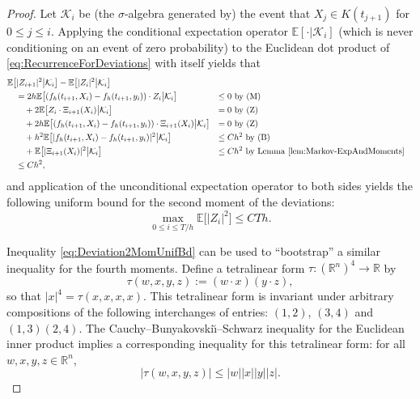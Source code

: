 \documentclass[reqno]{amsart}
\theoremstyle{definition}
\begin{document}
\begin{proof}
	Let $\mathcal{K}_{i}$ be (the $\sigma$-algebra generated by) the event that $X_{j} \in K(t_{j + 1})$ for $0 \leq j \leq i$.  Applying the conditional expectation operator ${\mathbb{E}} [ \cdot | \mathcal{K}_{i} ]$ (which is never conditioning on an event of zero probability) to the Euclidean dot product of \eqref{eq:RecurrenceForDeviations} with itself yields that
	\begin{align*}
		& {\mathbb{E}} \big[ | Z_{i + 1} |^{2} \big| \mathcal{K}_{i} \big] - {\mathbb{E}} \big[ | Z_{i} |^{2} \big| \mathcal{K}_{i} \big] \\
		& \quad = 2 h {\mathbb{E}} \big[ (f_{h} (t_{i + 1}, X_{i}) - f_{h} (t_{i + 1}, y_{i})) \cdot Z_{i} \big| \mathcal{K}_{i} \big] && \text{$\leq 0$ by (M)} \\
		& \qquad + 2 {\mathbb{E}} \big[ Z_{i} \cdot \Xi_{i + 1} (X_{i}) \big| \mathcal{K}_{i} \big] && \text{$= 0$ by (Z)} \\
		& \qquad + 2 h {\mathbb{E}} \big[ (f_{h} (t_{i + 1}, X_{i}) - f_{h} (t_{i + 1}, y_{i})) \cdot \Xi_{i + 1} (X_{i}) \big| \mathcal{K}_{i} \big] && \text{$= 0$ by (Z)} \\
		& \qquad + h^{2} {\mathbb{E}} \big[ | f_{h} (t_{i + 1}, X_{i}) - f_{h} (t_{i + 1}, y_{i}) |^{2} \big| \mathcal{K}_{i} \big] && \text{$\leq C h^{2}$ by (B)} \\
		& \qquad + {\mathbb{E}} \big[ | \Xi_{i + 1} (X_{i}) |^{2} \big| \mathcal{K}_{i} \big] && \text{$\leq C h^{2}$ by Lemma \ref{lem:Markov-ExpAndMoments}} \\
		& \quad \leq C h^{2},
	\end{align*}
	and application of the unconditional expectation operator to both sides yields the following uniform bound for the second moment of the deviations:
	\begin{equation}
		\label{eq:Deviation2MomUnifBd} 		\max_{0 \leq i \leq T / h} {\mathbb{E}} \big[ | Z_{i} |^{2} \big] \leq C T h.
	\end{equation}

	Inequality \eqref{eq:Deviation2MomUnifBd} can be used to ``bootstrap'' a similar inequality for the fourth moments. Define a tetralinear form $\tau \colon ({\mathbb{R}}^{n})^{4} \to {\mathbb{R}}$ by
	\begin{equation}
		\label{eq:TetralinearForm} 		\tau(w, x, y, z) := (w \cdot x) (y \cdot z),
	\end{equation}
	so that $| x |^{4} = \tau(x, x, x, x)$. This tetralinear form is invariant under arbitrary compositions of the following interchanges of entries: $(1, 2)$, $(3, 4)$ and $(1, 3) (2, 4)$.  The Cauchy--Bunyakovski{\u\i}--Schwarz inequality for the Euclidean inner product implies a corresponding inequality for this tetralinear form: for all $w, x, y, z \in {\mathbb{R}}^{n}$,
	\begin{equation}
		\label{eq:CS4} 		| \tau(w, x, y, z) | \leq | w | | x | | y | | z |.
	\end{equation}


\end{proof}
\end{document}
